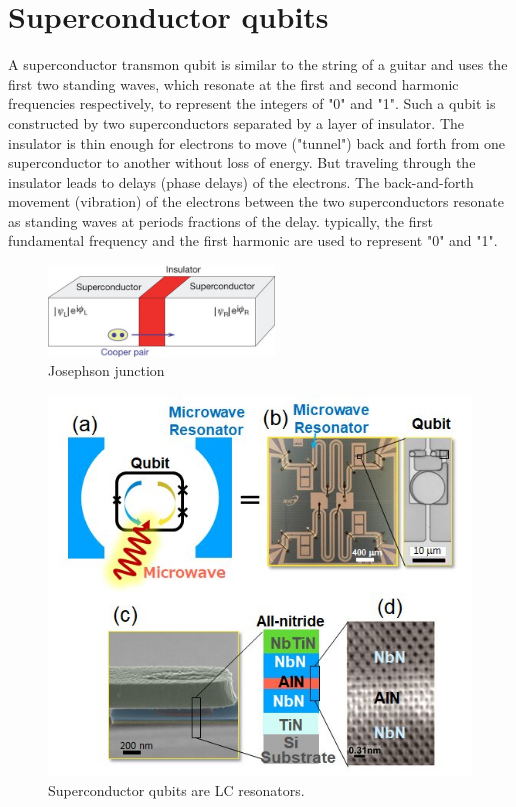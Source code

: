 \documentclass{book}
\begin{document}
\section{Superconductor qubits}
A superconductor transmon qubit is similar to the string of a guitar and uses the first two standing waves, which resonate at the first and second harmonic frequencies respectively, to represent the integers of "0" and "1". Such a qubit is constructed by two superconductors separated by a layer of insulator. The insulator is thin enough for electrons to move ("tunnel") back and forth from one superconductor to another without loss of energy. But traveling through the insulator leads to delays (phase delays) of the electrons. The back-and-forth movement (vibration) of the electrons between the two superconductors resonate as standing waves at periods fractions of the delay. typically, the first fundamental frequency and the first harmonic are used to represent "0" and "1".
\begin{figure}[ht]
\includegraphics[width=6cm]{pic/supercQubit.jpg}
\caption{Josephson junction}
\label{Superconductor}
\end{figure}

\begin{figure}[ht]
\includegraphics[width=12cm]{pic/superQubit.jpg}
\caption{Superconductor qubits are LC resonators.}
\label{superQubit}
\end{figure}
\end{document}
